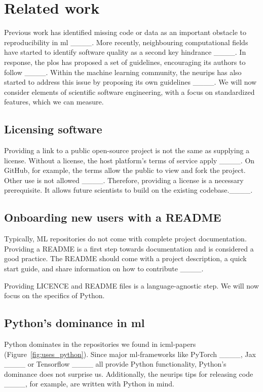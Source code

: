\section{Related work}
Previous work has identified missing code or data as an important obstacle
to reproducibility in \ac{ml} ____.
More recently, neighbouring computational fields have started to identify software quality
as a second key hindrance ____.
In response, the \ac{plos} has proposed a set of guidelines, encouraging its authors to follow 
____.
Within the machine learning community, the \ac{neurips} has also started to address this issue by proposing its own guidelines ____.
We will now consider elements of scientific software engineering, with a focus on standardized features, which we can measure.



\subsection{Licensing software}
Providing a link to a public open-source project is not the same as supplying a license. Without a license, the host platform's terms of service apply ____. On GitHub, for example, the terms allow the public to view and fork the project. Other use is not allowed ____. 
Therefore, providing a license is a necessary prerequisite. It allows future scientists to build on the existing codebase.____.

\subsection{Onboarding new users with a README}
Typically, ML repositories do not come with complete project documentation. Providing a README is a first step towards documentation and is considered a good practice.
The README should come with a project description, a quick start guide, and share information on how to contribute ____.
 
Providing LICENCE and README files is a language-agnostic step. We will now focus on the specifics of Python.


\subsection{Python's dominance in \ac{ml}}
Python dominates in the repositories we found in \ac{icml}-papers (Figure~\ref{fig:uses_python}). 
Since major \ac{ml}-frameworks like PyTorch ____,
Jax ____ or Tensorflow ____ all provide Python functionality, Python's dominance does not surprise us. Additionally, the \ac{neurips} tips for releasing code ____, for example, are written with Python in mind.

